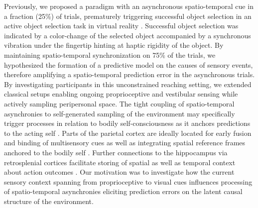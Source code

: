 Previously, we proposed a paradigm with an asynchronous spatio-temporal cue in a fraction (25\%) of trials, prematurely triggering successful object selection in an active object selection task in virtual reality \cite{Gehrke2019}. Successful object selection was indicated by a color-change of the selected object accompanied by a synchronous vibration under the fingertip hinting at haptic rigidity of the object. By maintaining spatio-temporal synchronization on 75\% of the trials, we hypothesized the formation of a predictive model on the causes of sensory events, therefore amplifying a spatio-temporal prediction error in the asynchronous trials. By investigating participants in this unconstrained reaching setting, we extended classical setups enabling ongoing proprioceptive and vestibular sensing while actively sampling peripersonal space. The tight coupling of spatio-temporal asynchronies to self-generated sampling of the environment may specifically trigger processes in relation to bodily self-consciousness as it anchors predictions to the acting self \cite{Blanke2015, Guterstam2015a}. Parts of the parietal cortex are ideally located for early fusion and binding of multisensory cues as well as integrating spatial reference frames anchored to the bodily self \cite{Clark2018, Gramann2009}. Further connections to the hippocampus via retrosplenial cortices facilitate storing of spatial as well as temporal context about action outcomes \cite{Pearson2011}. Our motivation was to investigate how the current sensory context spanning from proprioceptive to visual cues influences processing of spatio-temporal asynchronies eliciting prediction errors on the latent causal structure of the environment.








